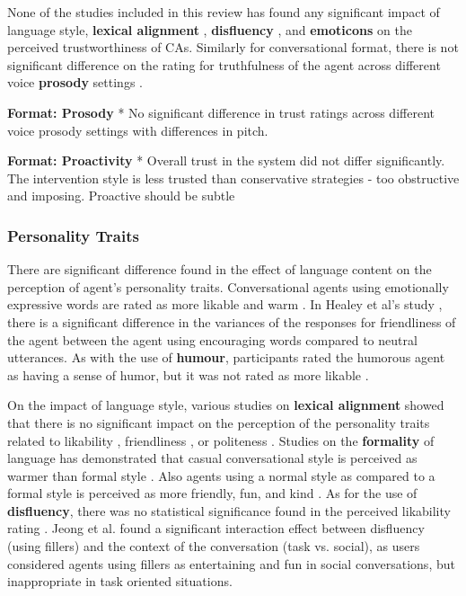 \documentclass[sigconf,screen,review, anonymous]{acmart}
\newcommand{\cmt}[1]{}%
\begin{document}
None of the studies included in this review has found any significant impact of language style, \textbf{lexical alignment} \cite{hoegen2019end}\cmt{[31]}\cite{huiyang2022improving}\cmt{[17]}\cite{linnemann2018can}\cmt{[15]}, \textbf{disfluency} \cite{pfeifer2009should}\cmt{[12]}, and \textbf{emoticons} \cite{wilhelm2022keep}\cmt{[28]} on the perceived trustworthiness of CAs. Similarly for conversational format, there is not significant difference on the rating for truthfulness of the agent across different voice \textbf{prosody} settings \cite{dubiel2020persuasive}\cmt{[60]}.

\textbf{Format: Prosody}
* No significant difference in trust ratings across different voice prosody settings with differences in pitch. \cite{cambre2019one}\cmt{[62]}

\textbf{Format: Proactivity}
* Overall trust in the system did not differ significantly. The intervention style is less trusted than conservative strategies - too obstructive and imposing. Proactive should be subtle  \cite{kraus2020effects}\cmt{[64]}

\subsubsection{Personality Traits}

There are significant difference found in the effect of language content on the perception of agent's personality traits. Conversational agents using emotionally expressive words are rated as more likable \cite{zhu2022effects}\cmt{[26]} and warm \cite{lee2019s}\cmt{[55]}. In Healey et al's study \cite{healey2013relating}\cmt{[39]}, there is a significant difference in the variances of the responses for friendliness of the agent between the agent using encouraging words compared to neutral utterances. As with the use of \textbf{humour}, participants rated the humorous agent as having a sense of humor, but it was not rated as more likable \cite{ceha2021can}\cmt{[57]}.

On the impact of language style, various studies on \textbf{lexical alignment} showed that there is no significant impact on the perception of the personality traits related to likability \cite{huiyang2022improving}\cmt{[17]}\cite{linnemann2018can}\cmt{[15]}, friendliness \cite{spillner2021talk}\cmt{[18]}, or politeness \cite{spillner2021talk}\cmt{[18]}. Studies on the \textbf{formality} of language has demonstrated that casual conversational style is perceived as warmer than formal style \cite{cox2022does}\cmt{[27]}. Also agents using a normal style as compared to a formal style is perceived as more friendly, fun, and kind \cite{ouchi2019should}\cmt{[59]}. As for the use of \textbf{disfluency}, there was no statistical significance found in the perceived likability rating \cite{jeong2019exploring}\cmt{[10]}\cite{pfeifer2009should}\cmt{[12]}. Jeong et al. \cite{jeong2019exploring} found a significant interaction effect between disfluency (using fillers) and the context of the conversation (task vs. social), as users considered agents using fillers as entertaining and fun in social conversations, but inappropriate in task oriented situations.
\end{document}
